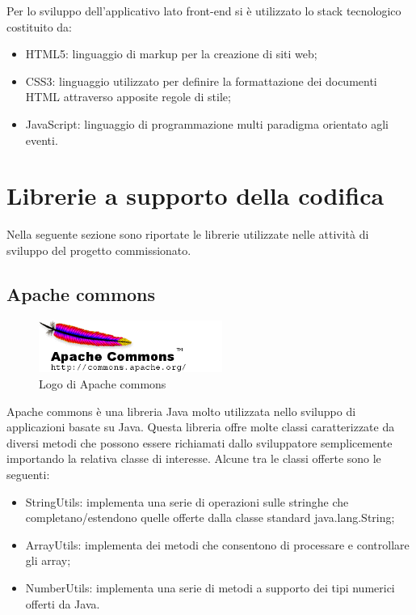 \noindent Per lo sviluppo dell'applicativo lato front-end si è utilizzato lo stack tecnologico costituito da:
\begin{itemize}
\item HTML5: linguaggio di markup per la creazione di siti web;
\item CSS3: linguaggio utilizzato per definire la formattazione dei documenti HTML attraverso apposite regole di stile;
\item JavaScript: linguaggio di programmazione multi paradigma orientato agli eventi.
\end{itemize}

\pagebreak

\section{Librerie a supporto della codifica}
Nella seguente sezione sono riportate le librerie utilizzate nelle attività di sviluppo del progetto commissionato. 

\subsection{Apache commons}

\begin{figure}[!h]
	\centering
	\includegraphics[width=6cm]{../images/Commons-logo.png}
	\caption{Logo di Apache commons}
\end{figure}

\noindent Apache commons è una libreria Java molto utilizzata nello sviluppo di applicazioni basate su Java. Questa libreria offre molte classi caratterizzate da diversi metodi che possono essere richiamati dallo sviluppatore semplicemente importando la relativa classe di interesse. Alcune tra le classi offerte sono le seguenti:
\begin{itemize}
\item StringUtils: implementa una serie di operazioni sulle stringhe che completano/estendono quelle offerte dalla classe standard java.lang.String;
\item ArrayUtils: implementa dei metodi che consentono di processare e controllare gli array; 
\item NumberUtils: implementa una serie di metodi a supporto dei tipi numerici offerti da Java.
\end{itemize} 

